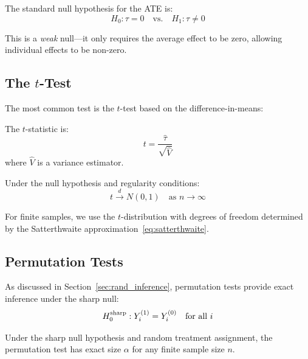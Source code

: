 The standard null hypothesis for the ATE is:
\begin{equation}
H_0: \tau = 0 \quad \text{vs.} \quad H_1: \tau \neq 0
\label{eq:null_hypothesis}
\end{equation}

This is a \emph{weak} null---it only requires the average effect to be zero, allowing individual effects to be non-zero.

\subsection{The $t$-Test}

The most common test is the $t$-test based on the difference-in-means:

\begin{definition}
\label{def:t_stat}
The $t$-statistic is:
\begin{equation}
t = \frac{\hat{\tau}}{\sqrt{\hat{V}}}
\label{eq:t_stat}
\end{equation}
where $\hat{V}$ is a variance estimator.
\end{definition}

Under the null hypothesis and regularity conditions:
\begin{equation}
t \xrightarrow{d} N(0, 1) \quad \text{as } n \to \infty
\label{eq:t_asymptotic}
\end{equation}

For finite samples, we use the $t$-distribution with degrees of freedom determined by the Satterthwaite approximation~\eqref{eq:satterthwaite}.

\subsection{Permutation Tests}

As discussed in Section~\ref{sec:rand_inference}, permutation tests provide exact inference under the sharp null:
\begin{equation}
H_0^{\text{sharp}}: Y^{(1)}_i = Y^{(0)}_i \quad \text{for all } i
\label{eq:sharp_null_ch3}
\end{equation}

\begin{proposition}
Under the sharp null hypothesis and random treatment assignment, the permutation test has exact size $\alpha$ for any finite sample size $n$.
\end{proposition}

